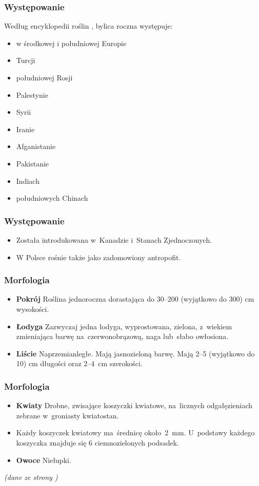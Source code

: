 \documentclass{beamer}
\begin{document}
\begin{frame}
	\frametitle{Występowanie}
	
	Według encyklopedii roślin \cite{site3}, bylica roczna występuje:
	
	\begin{itemize}
		\item w środkowej i południowej Europie
		\pause
		\item Turcji \pause
		\item południowej Rosji \pause 
		\item Palestynie \pause 
		\item Syrii \pause
		\item Iranie \pause
		\item Afganistanie \pause
		\item Pakistanie \pause
		\item Indiach \pause
		\item południowych Chinach
	\end{itemize}
\end{frame}

\begin{frame}
	\frametitle{Występowanie}
	\begin{itemize}
		\item Została introdukowana w~Kanadzie i~Stanach Zjednoczonych. \pause
		\item W Polsce rośnie także jako zadomowiony antropofit.\cite{ksiazka}
	\end{itemize}
\end{frame}

\begin{frame}
	\frametitle{Morfologia}
	\begin{itemize}
		\item
		\textbf{Pokrój}
		Roślina jednoroczna dorastająca do 30–200 (wyjątkowo do 300) cm wysokości.
		\pause
		\item
		\textbf{Łodyga}
		Zazwyczaj jedna łodyga, wyprostowana, zielona, z~wiekiem zmieniająca barwę na~czerwonobrązową, naga lub~słabo owłosiona.
		\pause
		\item
		\textbf{Liście}
		Naprzemianległe. Mają jasnozieloną barwę. Mają 2–5 (wyjątkowo do 10) cm długości oraz 2–4~cm szerokości.
		\end{itemize}
\end{frame}

\begin{frame}
	\frametitle{Morfologia}
	\begin{itemize}
		\item
		\textbf{Kwiaty}
		Drobne, zwisające koszyczki kwiatowe, na~licznych odgałęzieniach zebrane w~groniasty kwiatostan. \pause
		\item
		Każdy koszyczek kwiatowy ma~średnicę około~2~mm. U~podstawy każdego koszyczka znajduje się 6 ciemnozielonych podsadek.
		\pause
		\item
		\textbf{Owoce}
		Niełupki.
	\end{itemize}
	\centering
	\textit{ (dane ze strony \cite{site3}) }
\end{frame}
\end{document}
